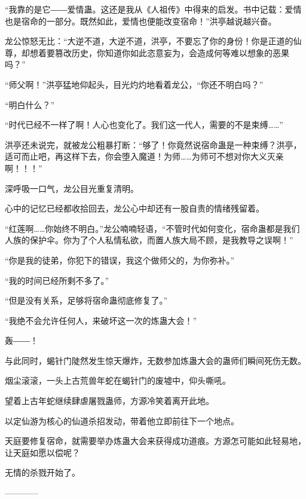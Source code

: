 \begin{this_body}
“我靠的是它――爱情蛊。这还是我从《人祖传》中得来的启发。书中记载：爱情也是宿命的一部分。既然如此，爱情也便能改变宿命！”洪亭越说越兴奋。

龙公惊怒无比：“大逆不道，大逆不道，洪亭，不要忘了你的身份！你是正道的仙尊，却想着要篡改历史，你知道你如此恣意妄为，会造成何等难以想象的恶果吗？”

“师父啊！”洪亭猛地仰起头，目光灼灼地看着龙公，“你还不明白吗？”

“明白什么？”

“时代已经不一样了啊！人心也变化了。我们这一代人，需要的不是束缚……”

洪亭还未说完，就被龙公粗暴打断：“够了！你竟然说宿命蛊是一种束缚？洪亭，适可而止吧，再这样下去，你会堕入魔道！为师……为师可不想对你大义灭亲啊！！！”

深呼吸一口气，龙公目光重复清明。

心中的记忆已经都收拾回去，龙公心中却还有一股自责的情绪残留着。

“红莲啊……你始终不明白。”龙公喃喃轻语，“不管时代如何变化，宿命蛊都是我们人族的保护伞。你为了个人私情私欲，而置人族大局不顾，是我教导之误啊！”

“你是我的徒弟，你犯下的错误，我这个做师父的，为你弥补。”

“我的时间已经所剩不多了。”

“但是没有关系，足够将宿命蛊彻底修复了。”

“我绝不会允许任何人，来破坏这一次的炼蛊大会！”

轰――！

与此同时，蝎针门陡然发生惊天爆炸，无数参加炼蛊大会的蛊师们瞬间死伤无数。

烟尘滚滚，一头上古荒兽年蛇在蝎针门的废墟中，仰头嘶吼。

望着上古年蛇继续肆虐屠戮蛊师，方源冷笑着离开此地。

以定仙游为核心的仙道杀招发动，带着他立即前往下一个地点。

天庭要修复宿命，就需要举办炼蛊大会来获得成功道痕。方源怎可能如此轻易地，让天庭如愿以偿呢？

无情的杀戮开始了。

------------

\end{this_body}

